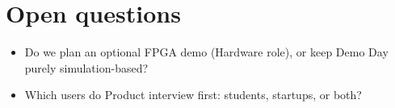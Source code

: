 \documentclass[11pt,a4paper]{article}
\begin{document}
\section{Open questions}
\begin{itemize}[nosep]
  \item Do we plan an optional FPGA demo (Hardware role), or keep Demo Day purely simulation-based?
  \item Which users do Product interview first: students, startups, or both?
\end{itemize}
\end{document}
